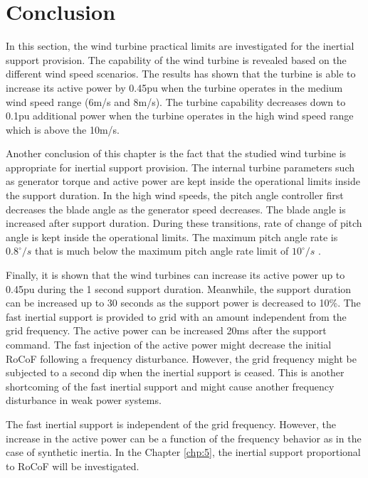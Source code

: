 \section{Conclusion}
In this section, the wind turbine practical limits are investigated for the inertial support provision. The capability of the wind turbine is revealed based on the different wind speed scenarios. The results has shown that the turbine is able to increase its active power by 0.45pu when the turbine operates in the medium wind speed range (6m/s and 8m/s). The turbine capability decreases down to 0.1pu additional power when the turbine operates in the high wind speed range which is above the 10m/s.\par
Another conclusion of this chapter is the fact that the studied wind turbine is appropriate for inertial support provision. The internal turbine parameters such as generator torque and active power are kept inside the operational limits inside the support duration. In the high wind speeds, the pitch angle controller first decreases the blade angle as the generator speed decreases. The blade angle is increased after support duration. During these transitions, rate of change of pitch angle is kept inside the operational limits. The maximum pitch angle rate is $0.8^{\circ}/s$ that is much below the maximum pitch angle rate limit of $10^{\circ}/s$ \cite{Ackermann2005a}.\par
Finally, it is shown that the wind turbines can increase its active power up to 0.45pu during the 1 second support duration. Meanwhile, the support duration can be increased up to 30 seconds as the support power is decreased to 10\%. The fast inertial support is provided to grid with an amount independent from the grid frequency. The active power can be increased 20ms after the support command. The fast injection of the active power might decrease the initial RoCoF following a frequency disturbance. However, the grid frequency might be subjected to a second dip when the inertial support is ceased. This is another shortcoming of the fast inertial support and might cause another frequency disturbance in weak power systems. \par
The fast inertial support is independent of the grid frequency. However, the increase in the active power can be a function of the frequency behavior as in the case of synthetic inertia. In the Chapter \ref{chp:5}, the inertial support proportional to RoCoF will be investigated. 